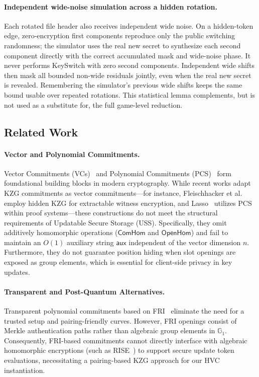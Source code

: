 \paragraph{Independent wide-noise simulation across a hidden rotation.}
Each rotated file header also receives independent wide noise. On a hidden-token edge, zero-encryption first components reproduce only the public switching randomness; the simulator uses the real new secret to synthesize each second component directly with the correct accumulated mask and wide-noise phase. It never performs KeySwitch with zero second components. Independent wide shifts then mask all bounded non-wide residuals jointly, even when the real new secret is revealed. Remembering the simulator's previous wide shifts keeps the same bound usable over repeated rotations. This statistical lemma complements, but is not used as a substitute for, the full game-level reduction.

\subsection{Related Work}
\label{sec:intro_related_work}

\paragraph{Vector and Polynomial Commitments.}
Vector Commitments (VCs)~\cite{CF13,BBF19,CFGKN20} and Polynomial Commitments (PCS)~\cite{KZG10} form foundational building blocks in modern cryptography. 
While recent works adapt KZG commitments as vector commitments—for instance, Fleischhacker et al.~\cite{FHS24} employ hidden KZG for extractable witness encryption, and Lasso~\cite{STW24} utilizes PCS within proof systems—these constructions do not meet the structural requirements of Updatable Secure Storage (USS). 
Specifically, they omit additively homomorphic operations ($\mathsf{ComHom}$ and $\mathsf{OpenHom}$) and fail to maintain an $O(1)$ auxiliary string $\mathsf{aux}$ independent of the vector dimension $n$. 
Furthermore, they do not guarantee position hiding when slot openings are exposed as group elements, which is essential for client-side privacy in key updates.

\paragraph{Transparent and Post-Quantum Alternatives.}
Transparent polynomial commitments based on FRI~\cite{BBHR18} eliminate the need for a trusted setup and pairing-friendly curves. 
However, FRI openings consist of Merkle authentication paths rather than algebraic group elements in $\mathbb{G}_1$. 
Consequently, FRI-based commitments cannot directly interface with algebraic homomorphic encryptions (such as RISE~\cite{LT18}) to support secure update token evaluations, necessitating a pairing-based KZG approach for our HVC instantiation.

